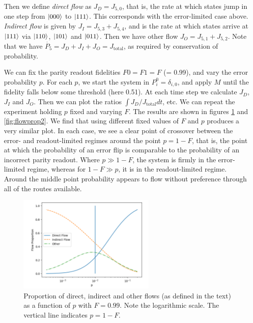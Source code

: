 \documentclass{report}
\begin{document}
Then we define \textit{direct flow} as $J_D = J_{5,0}$, that is, the rate at which states jump in one step from $\ket{000}$ to $\ket{111}$. This corresponds with the error-limited case above. \textit{Indirect flow} is given by $J_I = J_{5,3} + J_{5,4}$, and is the rate at which states arrive at $\ket{111}$ via $\ket{110}$, $\ket{101}$ and $\ket{011}$. Then we have other flow $J_O = J_{5,1} + J_{5,2}$. Note that we have $\dot{P_5} = J_D + J_I + J_O = J_\mathrm{total}$, as required by conservation of probability.

We can fix the parity readout fidelities $F0 = F1 = F$ (= 0.99), and vary the error probability $p$. For each $p$, we start the system in $P^0_i = \delta_{i,0}$, and apply $M$ until the fidelity falls below some threshold (here 0.51). At each time step we calculate $J_D$, $J_I$ and $J_O$. Then we can plot the ratios $\int J_D/J_\mathrm{total}dt $, etc. We can repeat the experiment holding $p$ fixed and varying $F$. The results are shown in figures \ref{fig:flowprop1} and \ref{fig:flowprop2}. We find that using different fixed values of $F$ and $p$ produces a very similar plot. In each case, we see a clear point of crossover between the error- and readout-limited regimes around the point $p = 1-F$, that is, the point at which the probability of an error flip is comparable to the probability of an incorrect parity readout. Where $p \gg 1-F$, the system is firmly in the error-limited regime, whereas for $1-F \gg p$, it is in the readout-limited regime. Around the middle point probability appears to flow without preference through all of the routes available.
\begin{figure}[ht]
    \centering
        \centering
        \includegraphics[width=0.6\textwidth]{Figures/flow/f_fixed.png} %
        \caption{Proportion of direct, indirect and other flows (as defined in the text) as a function of $p$ with $F = 0.99$. Note the logarithmic scale. The vertical line indicates $p = 1-F$.}
        \label{fig:flowprop1}
\end{figure}
    
\end{document}

